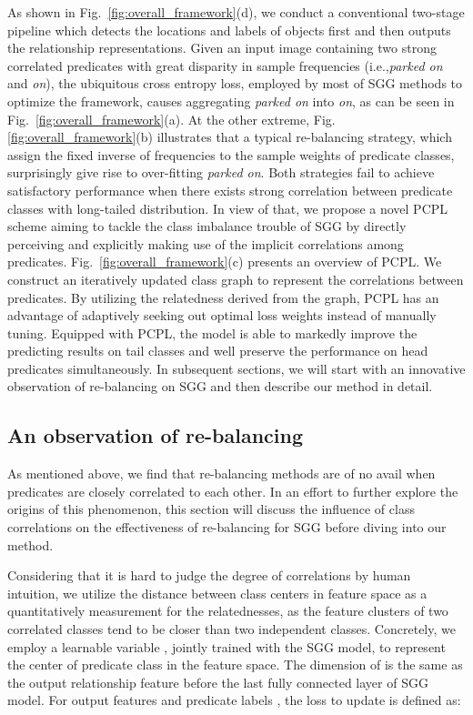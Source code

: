 \documentclass[sigconf]{acmart}
\begin{document}
 As shown in Fig.~\ref{fig:overall_framework}(d), we conduct a conventional two-stage pipeline which detects the locations and labels of objects first and then outputs the relationship representations. Given an input image containing two strong correlated predicates with great disparity in sample frequencies (i.e.,\emph{parked on} and \emph{on}), the ubiquitous cross entropy loss, employed by most of SGG methods to optimize the framework, causes aggregating \emph{parked on} into \emph{on}, as can be seen in Fig.~\ref{fig:overall_framework}(a). At the other extreme, Fig.~ \ref{fig:overall_framework}(b) illustrates that a typical re-balancing strategy, which assign the 
fixed inverse of frequencies to the sample weights of predicate classes, surprisingly give rise to over-fitting \emph{parked on}. Both strategies fail to achieve satisfactory performance when there exists strong correlation between predicate classes with long-tailed distribution. In view of that, we propose a novel PCPL scheme aiming to tackle the class imbalance trouble of SGG by directly perceiving and explicitly making use of the implicit correlations among predicates. Fig.~\ref{fig:overall_framework}(c) presents an overview of PCPL. We construct an iteratively updated class graph to represent the correlations between predicates. By utilizing the relatedness derived from the graph, PCPL has an 
advantage of adaptively seeking out optimal loss weights instead of manually tuning. Equipped with PCPL, the model is able to markedly improve the predicting results on tail classes and well preserve the performance on head predicates simultaneously. In subsequent sections, we will start with an innovative observation of re-balancing on SGG and then describe our method in detail.

\subsection{An observation of re-balancing}
As mentioned above, we find that re-balancing methods are of no avail when predicates are closely correlated to each other. In an effort to further explore the origins of this phenomenon, this section will discuss the influence of class correlations on the effectiveness of re-balancing for SGG before diving into our method.

Considering that it is hard to judge the degree of correlations by human intuition, we utilize the distance between class centers in feature space as a quantitatively measurement for the relatednesses, as the feature clusters of two correlated classes tend to be closer than two independent classes. Concretely, we employ a learnable variable , jointly trained with the SGG model, to represent the center of predicate class  in the feature space. The dimension of  is the same as the output relationship feature before the last fully connected layer of SGG model. For output features  and predicate labels , the loss to update  is defined as:
\end{document}
